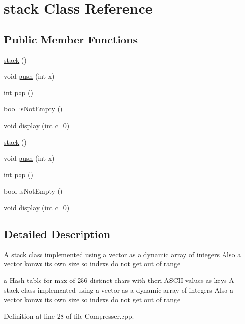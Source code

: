 \hypertarget{classstack}{\section{stack \-Class \-Reference}
\label{classstack}
}
\subsection*{\-Public \-Member \-Functions}
\begin{DoxyCompactItemize}
\item 
\hyperlink{classstack_a65efc6bf4210228326d0a6a2813fd406}{stack} ()
\item 
void \hyperlink{classstack_a369ccc4ef37f906c241bda729765d6e0}{push} (int x)
\item 
int \hyperlink{classstack_aa3a0c61802b2587f2ac4eb6db4fe8f3b}{pop} ()
\item 
bool \hyperlink{classstack_a3a7cb511f0fbb34fa5a0fbf2e112a21d}{is\-Not\-Empty} ()
\item 
void \hyperlink{classstack_a42d3dce03a93332894f683c33975bd59}{display} (int c=0)
\item 
\hyperlink{classstack_a65efc6bf4210228326d0a6a2813fd406}{stack} ()
\item 
void \hyperlink{classstack_a369ccc4ef37f906c241bda729765d6e0}{push} (int x)
\item 
int \hyperlink{classstack_aa3a0c61802b2587f2ac4eb6db4fe8f3b}{pop} ()
\item 
bool \hyperlink{classstack_a3a7cb511f0fbb34fa5a0fbf2e112a21d}{is\-Not\-Empty} ()
\item 
void \hyperlink{classstack_a42d3dce03a93332894f683c33975bd59}{display} (int c=0)
\end{DoxyCompactItemize}


\subsection{\-Detailed \-Description}
\-A stack class implemented using a vector as a dynamic array of integers \-Also a vector konws its own size so indexs do not get out of range

a \-Hash table for max of 256 distinct chars with theri \-A\-S\-C\-I\-I values as keys \-A stack class implemented using a vector as a dynamic array of integers \-Also a vector konws its own size so indexs do not get out of range 

\-Definition at line 28 of file \-Compresser.\-cpp.



